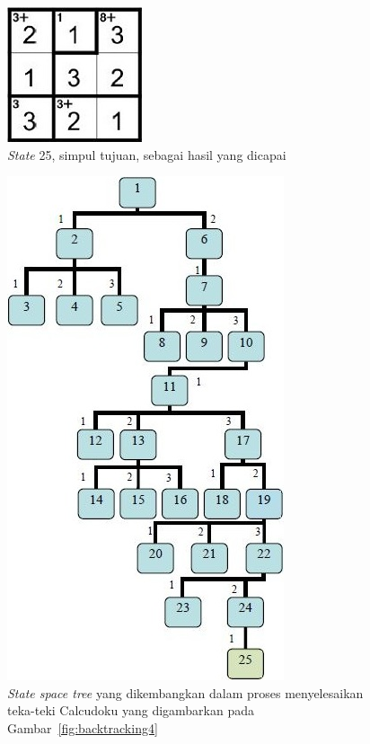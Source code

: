 \begin{enumerate}
\begin{figure}
\centering
\captionsetup{justification=centering}
\includegraphics[scale=0.75]{Gambar/Backtracking7}
\caption[\textit{State} 25, simpul tujuan, sebagai hasil yang dicapai ~\cite{fahda:16:backtracking}]{\textit{State} 25, simpul tujuan, sebagai hasil yang dicapai ~\cite{fahda:16:backtracking}}
\label{fig:backtracking7}
\end{figure}

\end{enumerate}

\begin{figure}
\centering
\captionsetup{justification=centering}
\includegraphics[scale=1]{Gambar/Backtracking8}
\caption[\textit{State space tree} yang dikembangkan dalam proses menyelesaikan teka-teki Calcudoku yang digambarkan pada Gambar~\ref{fig:backtracking4} ~\cite{fahda:16:backtracking}]{\textit{State space tree} yang dikembangkan dalam proses menyelesaikan teka-teki Calcudoku yang digambarkan pada Gambar~\ref{fig:backtracking4} ~\cite{fahda:16:backtracking}}
\label{fig:backtracking8}
\end{figure}

